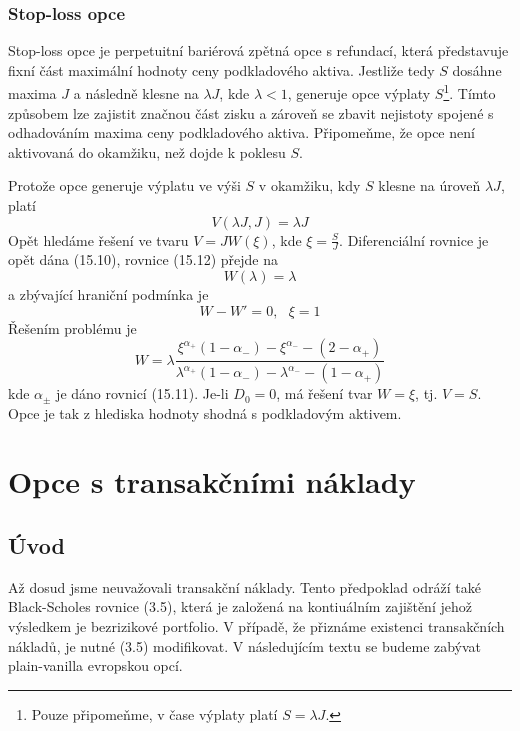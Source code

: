 \documentclass[a4paper]{book}
\begin{document}
\subsection{Stop-loss opce}

Stop-loss opce je perpetuitní bariérová zpětná opce s refundací, která představuje fixní část maximální hodnoty ceny podkladového aktiva. Jestliže tedy $S$ dosáhne maxima $J$ a následně klesne na $\lambda J$, kde $\lambda < 1$, generuje opce výplaty $S$\footnote{Pouze připomeňme, v čase výplaty platí $S = \lambda J$.}. Tímto způsobem lze zajistit značnou část zisku a zároveň se zbavit nejistoty spojené s odhadováním maxima ceny podkladového aktiva. Připomeňme, že opce není aktivovaná do okamžiku, než dojde k poklesu $S$.

Protože opce generuje výplatu ve výši $S$ v okamžiku, kdy $S$ klesne na úroveň $\lambda J$, platí
\begin{equation}
V(\lambda J, J) = \lambda J
\end{equation}
Opět hledáme řešení ve tvaru $V = J W(\xi)$, kde $\xi = \frac{S}{J}$. Diferenciální rovnice je opět dána (15.10), rovnice (15.12) přejde na
\begin{equation*}
W(\lambda) = \lambda
\end{equation*}
a zbývající hraniční podmínka je
\begin{equation*}
W - W' = 0, ~~~ \xi = 1
\end{equation*}
Řešením problému je
\begin{equation*}
W = \lambda \frac{\xi^{\alpha_{+}}(1 - \alpha_{-}) - \xi^{\alpha_{-}} - (2 - \alpha_{+})}{\lambda^{\alpha_{+}}(1 - \alpha_{-}) - \lambda^{\alpha_{-}} - (1 - \alpha_{+})}
\end{equation*}
kde $\alpha_{\pm}$ je dáno rovnicí (15.11). Je-li $D_0 = 0$, má řešení tvar $W = \xi$, tj. $V = S$. Opce je tak z hlediska hodnoty shodná s podkladovým aktivem.

\chapter{Opce s transakčními náklady}

\section{Úvod}

Až dosud jsme neuvažovali transakční náklady. Tento předpoklad odráží také Black-Scholes rovnice (3.5), která je založená na kontiuálním zajištění jehož výsledkem je bezrizikové portfolio. V případě, že přiznáme existenci transakčních nákladů, je nutné (3.5) modifikovat. V následujícím textu se budeme zabývat plain-vanilla evropskou opcí.
\end{document}
